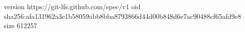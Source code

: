 version https://git-lfs.github.com/spec/v1
oid sha256:afa131962a3e1b58059abb8bba8793866d44d00b848d6e7ac90488cf65afd9e8
size 612257
